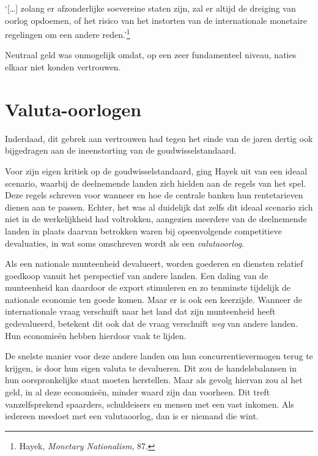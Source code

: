 \documentclass[
  a5paper,
  smalldemyvopaper,11pt,twoside,onecolumn,openright,extrafontsizes,
hidelinks]{memoir}
\renewenvironment{quote}%
               {\list{}{\rightmargin=.3cm\leftmargin=.3cm}%
                \itshape \item[]}%
               {\endlist}
\begin{document}
\begin{quote}
`{[}\ldots{]} zolang er afzonderlijke soevereine staten zijn, zal er
altijd de dreiging van oorlog opdoemen, of het risico van het instorten
van de internationale monetaire regelingen om een andere
reden.'\footnote{\hspace{0pt}Hayek, \emph{Monetary Nationalism}, 87.}
\end{quote}

Neutraal geld was onmogelijk omdat, op een zeer fundamenteel niveau,
naties elkaar niet konden vertrouwen.

\section{Valuta-oorlogen}\label{valuta-oorlogen}

Inderdaad, dit gebrek aan vertrouwen had tegen het einde van de jaren
dertig ook bijgedragen aan de ineenstorting van de goudwisselstandaard.

Voor zijn eigen kritiek op de goudwisselstandaard, ging Hayek uit van
een ideaal scenario, waarbij de deelnemende landen zich hielden aan de
regels van het spel. Deze regels schreven voor wanneer en hoe de
centrale banken hun rentetarieven dienen aan te passen. Echter, het was
al duidelijk dat zelfs dit ideaal scenario zich niet in de werkelijkheid
had voltrokken, aangezien meerdere van de deelnemende landen in plaats
daarvan betrokken waren bij opeenvolgende competitieve devaluaties, in
wat soms omschreven wordt als een \emph{valutaoorlog}.

Als een nationale munteenheid devalueert, worden goederen en diensten
relatief goedkoop vanuit het perspectief van andere landen. Een daling
van de munteenheid kan daardoor de export stimuleren en zo tenminste
tijdelijk de nationale economie ten goede komen. Maar er is ook een
keerzijde. Wanneer de internationale vraag verschuift naar het land dat
zijn munteenheid heeft gedevalueerd, betekent dit ook dat de vraag
verschuift \emph{weg} van andere landen. Hun economieën hebben hierdoor
vaak te lijden.

De snelste manier voor deze andere landen om hun concurrentievermogen
terug te krijgen, is door hun eigen valuta te devalueren. Dit zou de
handelsbalansen in hun oorspronkelijke staat moeten herstellen. Maar als
gevolg hiervan zou al het geld, in al deze economieën, minder waard zijn
dan voorheen. Dit treft vanzelfsprekend spaarders, schuldeisers en
mensen met een vast inkomen. Als iedereen meedoet met een valutaoorlog,
dan is er niemand die wint.
\end{document}
